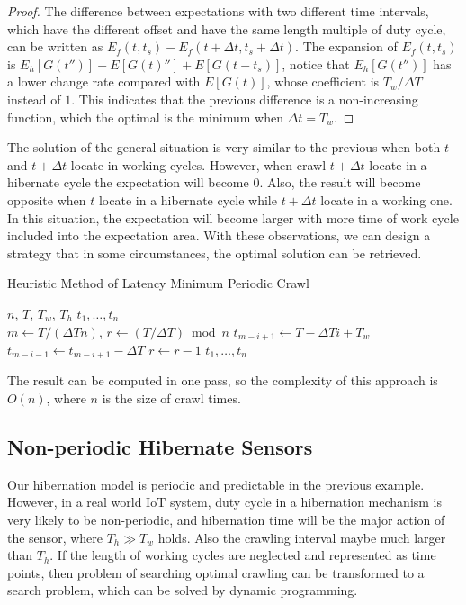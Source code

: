 \documentclass[conference]{IEEEtran}
\begin{document}
\begin{proof}
The difference between expectations with two different time intervals, which have the different offset and have the same length multiple of duty cycle, can be written as $E_f(t, t_s)-E_f(t+\Delta t, t_s+\Delta t)$. 
The expansion of $E_f(t,t_s)$ is $E_h[G(t'')]-E[G(t)'']+E[G(t-t_s)]$, notice that $E_h[G(t'')]$ has a lower change rate compared with $E[G(t)]$, whose coefficient is $T_w/\Delta T$ instead of $1$. This indicates that the previous difference is a non-increasing function, which the optimal is the minimum when $\Delta t =T_w$.
\end{proof}


The solution of the general situation is very similar to the previous when both $t$ and $t+\Delta t$ locate in working cycles. However, when crawl $t+\Delta t$  locate in a hibernate cycle the expectation will become $0$. Also, the result will become opposite when $t$ locate in a hibernate cycle while $t+\Delta t$ locate in a working one. In this situation, the expectation will become larger with more time of work cycle included into the expectation area. 
With these observations, we can design a strategy that in some circumstances, the optimal solution can be retrieved.

\begin{algorithm}
\caption{Heuristic Method of Latency Minimum Periodic Crawl}
  \begin{algorithmic}[1]
  \renewcommand{\algorithmicrequire}{\textbf{Input:}}
  \renewcommand{\algorithmicensure}{\textbf{Output:}}
  \REQUIRE $n$, $T$, $T_w$, $T_h$
  \ENSURE  $t_1,\ldots,t_n$
  \\ 
  \STATE $m \gets T/(\Delta T n)$, $r\gets (T/\Delta T)\bmod{n}$
    \STATE $t_{m-i+1}\gets T-\Delta T i + T_w$
    	\STATE $t_{m-i-1}\gets t_{m-i+1}-\Delta T$
        \STATE $r\gets r-1$
    \ENDIF
  \ENDFOR
  \RETURN $t_1,\ldots,t_n$
  \end{algorithmic} 
\end{algorithm}

The result can be computed in one pass, so the complexity of this approach is $O(n)$, where $n$ is the size of crawl times.

\subsection{Non-periodic Hibernate Sensors}
Our hibernation model is periodic and predictable in the previous example. However, in a real world IoT system, duty cycle in a hibernation mechanism is very likely to be non-periodic, and hibernation time will be the major action of the sensor, where $T_h\gg T_w$ holds. Also the crawling interval maybe much larger than $T_h$. 
If the length of working cycles are neglected and represented as time points, then problem of searching optimal crawling can be transformed to a search problem, which can be solved by dynamic programming.
\end{document}
